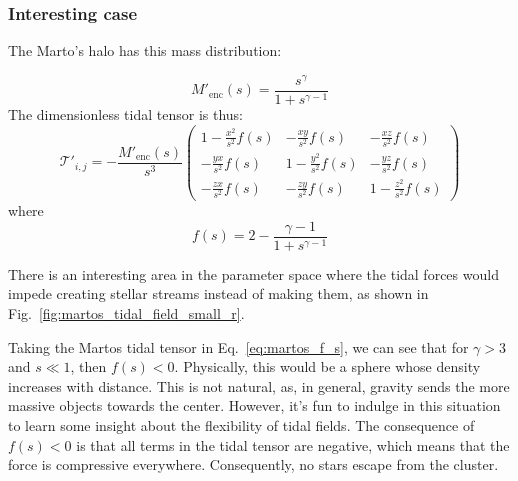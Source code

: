    
        \subsubsection*{Interesting case}

            The Marto's halo has this mass distribution:
            
            \begin{equation}
                M'_\text{enc}(s) = \frac{s^\gamma}{1+s^{\gamma-1}}
            \end{equation}
            The dimensionless tidal tensor is thus: 
            \begin{equation}
                \mathcal{T'}_{i,j}= -\frac{M'_\text{enc}(s)}{s^3}\left(\begin{matrix}
                    1-\frac{x^2}{s^2}f(s) & -\frac{xy}{s^2}f(s) & -\frac{xz}{s^2}f(s) \\
                    -\frac{yx}{s^2}f(s) & 1-\frac{y^2}{s^2}f(s) & -\frac{yz}{s^2}f(s) \\
                    -\frac{zx}{s^2}f(s) & -\frac{zy}{s^2}f(s) & 1-\frac{z^2}{s^2}f(s)
                \end{matrix}\right)
            \end{equation}  
            where 
            \begin{equation}
                f(s) = 2-\frac{\gamma-1}{1+s^{\gamma-1}}
                \label{eq:martos_f_s}
            \end{equation}

            There is an interesting area in the parameter space where the tidal forces would impede creating stellar streams instead of making them, as shown in Fig.~\ref{fig:martos_tidal_field_small_r}.

            Taking the Martos tidal tensor in Eq.~\ref{eq:martos_f_s}, we can see that for $\gamma > 3$ and $s \ll  1$, then $f(s)< 0$. Physically, this would be a sphere whose density increases with distance. This is not natural, as, in general, gravity sends the more massive objects towards the center. However, it's fun to indulge in this situation to learn some insight about the flexibility of tidal fields. The consequence of $f(s)< 0$ is that all terms in the tidal tensor are negative, which means that the force is compressive everywhere. Consequently, no stars escape from the cluster. 

